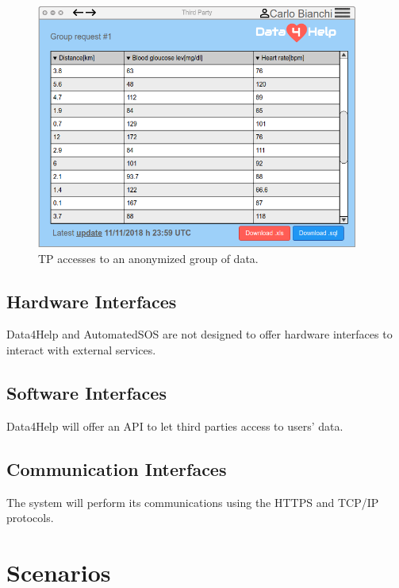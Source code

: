 \begin{figure}[ht]
    \renewcommand{\thefigure}{\alph{figure}}
    \centering
    \captionsetup{labelformat=parens, labelsep=space, name=}
    \includegraphics[width=300pt]{images/Mock-up/Third_Party_webPage.png}
    \caption{TP accesses to an anonymized group of data.}
\end{figure}
\clearpage

\subsection{Hardware Interfaces}
Data4Help and AutomatedSOS are not designed to offer hardware interfaces to interact with external services.
\subsection{Software Interfaces}
Data4Help will offer an API to let third parties access to users' data.
\subsection{Communication Interfaces}
The system will perform its communications using the HTTPS and TCP/IP protocols.

\section{Scenarios}
